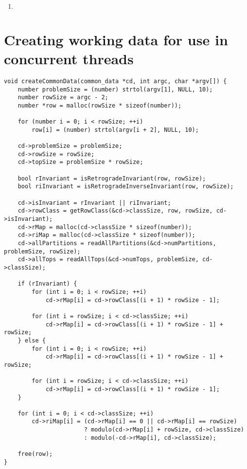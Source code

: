 \begin{enumerate}
\addtocounter{enumi}{1}
\item 
\end{enumerate}

\section{Creating working data for use in concurrent threads}

\begin{lstlisting}[caption={},label={createCommonData}]
void createCommonData(common_data *cd, int argc, char *argv[]) {
    number problemSize = (number) strtol(argv[1], NULL, 10);
    number rowSize = argc - 2;
    number *row = malloc(rowSize * sizeof(number));

    for (number i = 0; i < rowSize; ++i)
        row[i] = (number) strtol(argv[i + 2], NULL, 10);

    cd->problemSize = problemSize;
    cd->rowSize = rowSize;
    cd->topSize = problemSize * rowSize;

    bool rInvariant = isRetrogradeInvariant(row, rowSize);
    bool riInvariant = isRetrogradeInverseInvariant(row, rowSize);

    cd->isInvariant = rInvariant || riInvariant;
    cd->rowClass = getRowClass(&cd->classSize, row, rowSize, cd->isInvariant);
    cd->rMap = malloc(cd->classSize * sizeof(number));
    cd->riMap = malloc(cd->classSize * sizeof(number));
    cd->allPartitions = readAllPartitions(&cd->numPartitions, problemSize, rowSize);
    cd->allTops = readAllTops(&cd->numTops, problemSize, cd->classSize);

    if (rInvariant) {
        for (int i = 0; i < rowSize; ++i)
            cd->rMap[i] = cd->rowClass[(i + 1) * rowSize - 1];

        for (int i = rowSize; i < cd->classSize; ++i)
            cd->rMap[i] = cd->rowClass[(i + 1) * rowSize - 1] + rowSize;
    } else {
        for (int i = 0; i < rowSize; ++i)
            cd->rMap[i] = cd->rowClass[(i + 1) * rowSize - 1] + rowSize;

        for (int i = rowSize; i < cd->classSize; ++i)
            cd->rMap[i] = cd->rowClass[(i + 1) * rowSize - 1];
    }

    for (int i = 0; i < cd->classSize; ++i)
        cd->riMap[i] = (cd->rMap[i] == 0 || cd->rMap[i] == rowSize)
                       ? modulo(cd->rMap[i] + rowSize, cd->classSize)
                       : modulo(-cd->rMap[i], cd->classSize);

    free(row);
}
\end{lstlisting}

